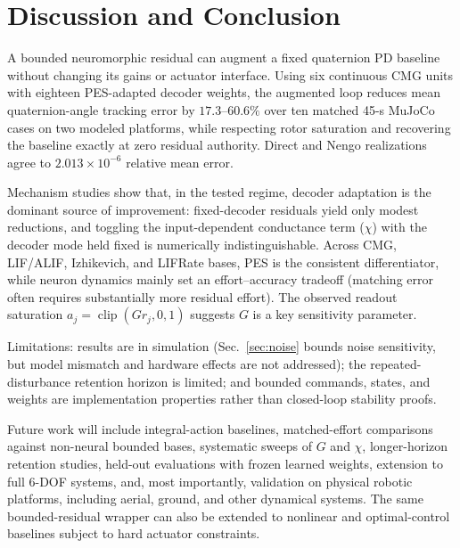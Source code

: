 \documentclass[letterpaper, 10 pt, conference]{ieeeconf}
\newcommand{\clip}{\operatorname{clip}}
\begin{document}
\section{Discussion and Conclusion}
\label{sec:conclusion}
A bounded neuromorphic residual can augment a fixed quaternion PD baseline without changing its gains or actuator interface. Using six continuous CMG units with eighteen PES-adapted decoder weights, the augmented loop reduces mean quaternion-angle tracking error by $17.3$--$60.6\%$ over ten matched 45-s MuJoCo cases on two modeled platforms, while respecting rotor saturation and recovering the baseline exactly at zero residual authority. Direct and Nengo realizations agree to $2.013\times10^{-6}$ relative mean error.

Mechanism studies show that, in the tested regime, decoder adaptation is the dominant source of improvement: fixed-decoder residuals yield only modest reductions, and toggling the input-dependent conductance term ($\chi$) with the decoder mode held fixed is numerically indistinguishable. Across CMG, LIF/ALIF, Izhikevich, and LIFRate bases, PES is the consistent differentiator, while neuron dynamics mainly set an effort--accuracy tradeoff (matching error often requires substantially more residual effort). The observed readout saturation $a_j=\clip(Gr_j,0,1)$ suggests $G$ is a key sensitivity parameter.

Limitations: results are in simulation (Sec.~\ref{sec:noise} bounds noise sensitivity, but model mismatch and hardware effects are not addressed); the repeated-disturbance retention horizon is limited; and bounded commands, states, and weights are implementation properties rather than closed-loop stability proofs.

Future work will include integral-action baselines, matched-effort comparisons against non-neural bounded bases, systematic sweeps of $G$ and $\chi$, longer-horizon retention studies, held-out evaluations with frozen learned weights, extension to full 6-DOF systems, and, most importantly, validation on physical robotic platforms, including aerial, ground, and other dynamical systems. The same bounded-residual wrapper can also be extended to nonlinear and optimal-control baselines subject to hard actuator constraints.





\end{document}
